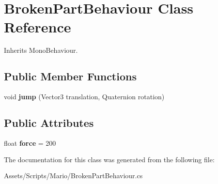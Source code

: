 \hypertarget{class_broken_part_behaviour}{\section{Broken\-Part\-Behaviour Class Reference}
\label{class_broken_part_behaviour}
}


Inherits Mono\-Behaviour.

\subsection*{Public Member Functions}
\begin{DoxyCompactItemize}
\item 
\hypertarget{class_broken_part_behaviour_abb7b631429ec282b3035e42cc91f7ed1}{void {\bfseries jump} (Vector3 translation, Quaternion rotation)}\label{class_broken_part_behaviour_abb7b631429ec282b3035e42cc91f7ed1}

\end{DoxyCompactItemize}
\subsection*{Public Attributes}
\begin{DoxyCompactItemize}
\item 
\hypertarget{class_broken_part_behaviour_a318cd7dfa31bc22b05dac339bd06e370}{float {\bfseries force} = 200}\label{class_broken_part_behaviour_a318cd7dfa31bc22b05dac339bd06e370}

\end{DoxyCompactItemize}


The documentation for this class was generated from the following file\-:\begin{DoxyCompactItemize}
\item 
Assets/\-Scripts/\-Mario/Broken\-Part\-Behaviour.\-cs\end{DoxyCompactItemize}
